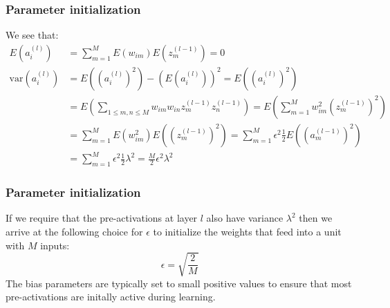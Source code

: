 \documentclass{beamer}
\begin{document}
\begin{frame}
    \frametitle{Parameter initialization}
    We see that:
    \begin{align*}
        E(a^{(l)}_{i})&=\sum_{m=1}^{M}E(w_{im})E(z^{(l-1)}_{m})=0 \\
        \mathrm{var}(a^{(l)}_{i})&=E((a^{(l)}_{i})^{2})-(E(a^{(l)}_{i}))^{2}=E((a^{(l)}_{i})^{2}) \\
        &=E(\sum_{1\le{}m,n\le{}M}w_{im}w_{in}z^{(l-1)}_{m}z^{(l-1)}_{n})=E(\sum_{m=1}^{M}w_{im}^{2}(z^{(l-1)}_{m})^{2}) \\
        &=\sum_{m=1}^{M}E(w_{im}^{2})E((z^{(l-1)}_{m})^{2})=\sum_{m=1}^{M}\epsilon^{2}\frac{1}{2}E((a^{(l-1)}_{m})^{2}) \\
        &=\sum_{m=1}^{M}\epsilon^{2}\frac{1}{2}\lambda^{2}=\frac{M}{2}\epsilon^{2}\lambda^{2}
    \end{align*}
\end{frame}

\begin{frame}
    \frametitle{Parameter initialization}
    If we require that the pre-activations at layer $l$ also have variance $\lambda^{2}$ then we arrive at the following choice for $\epsilon$ to initialize the weights that feed into a unit with $M$ inputs:
    \begin{equation*}
        \epsilon=\sqrt{\frac{2}{M}}
    \end{equation*}
    The bias parameters are typically set to small positive values to ensure that most pre-activations are initally active during learning.
\end{frame}
\end{document}
